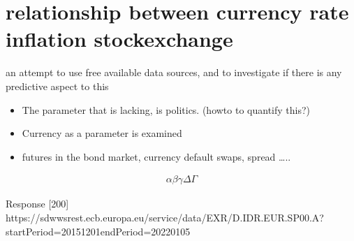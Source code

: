 \documentclass[letterpaper,10pt,english]{sphinxmanual}
\begin{document}
\section{relationship between currency rate \sphinxhyphen{} inflation \sphinxhyphen{} stockexchange}
\label{\detokenize{indonesia:relationship-between-currency-rate-inflation-stockexchange}}
\sphinxAtStartPar
an attempt to use free available data sources, and to investigate if
there is any predictive aspect to this
\begin{itemize}
\item {} 
\sphinxAtStartPar
The parameter that is lacking, is politics. (howto to quantify this?)

\item {} 
\sphinxAtStartPar
Currency as a parameter is examined

\item {} 
\sphinxAtStartPar
futures in the bond market, currency default swaps, spread …..

\end{itemize}
\begin{equation*}
\begin{split}\alpha\beta\gamma\Delta\Gamma\end{split}
\end{equation*}
\begin{sphinxVerbatim}[commandchars=\\\{\}]
\end{sphinxVerbatim}

\begin{sphinxVerbatim}[commandchars=\\\{\}]
\PYGZlt{}Response [200]\PYGZgt{}
https://sdw\PYGZhy{}wsrest.ecb.europa.eu/service/data/EXR/D.IDR.EUR.SP00.A?startPeriod=2015\PYGZhy{}12\PYGZhy{}01\PYGZam{}endPeriod=2022\PYGZhy{}01\PYGZhy{}05
\end{sphinxVerbatim}
\end{document}
